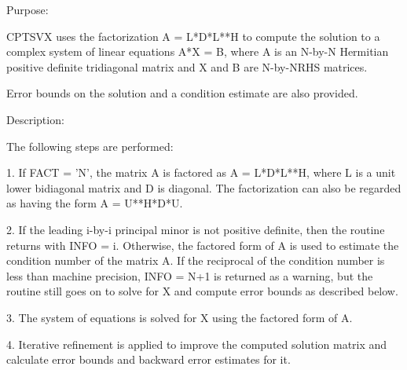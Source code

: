  \begin{DoxyParagraph}{Purpose\+: }
\begin{DoxyVerb} CPTSVX uses the factorization A = L*D*L**H to compute the solution
 to a complex system of linear equations A*X = B, where A is an
 N-by-N Hermitian positive definite tridiagonal matrix and X and B
 are N-by-NRHS matrices.

 Error bounds on the solution and a condition estimate are also
 provided.\end{DoxyVerb}
 
\end{DoxyParagraph}
\begin{DoxyParagraph}{Description\+: }
\begin{DoxyVerb} The following steps are performed:

 1. If FACT = 'N', the matrix A is factored as A = L*D*L**H, where L
    is a unit lower bidiagonal matrix and D is diagonal.  The
    factorization can also be regarded as having the form
    A = U**H*D*U.

 2. If the leading i-by-i principal minor is not positive definite,
    then the routine returns with INFO = i. Otherwise, the factored
    form of A is used to estimate the condition number of the matrix
    A.  If the reciprocal of the condition number is less than machine
    precision, INFO = N+1 is returned as a warning, but the routine
    still goes on to solve for X and compute error bounds as
    described below.

 3. The system of equations is solved for X using the factored form
    of A.

 4. Iterative refinement is applied to improve the computed solution
    matrix and calculate error bounds and backward error estimates
    for it.\end{DoxyVerb}
 
\end{DoxyParagraph}

